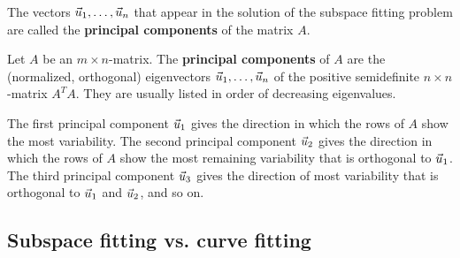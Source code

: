 \documentclass{ximera}
\begin{document}
The vectors $\vec{u}_1,\ldots,\vec{u}_n$ that appear in the solution
of the subspace fitting problem are called the \textbf{principal
  components} of the matrix $A$.

\begin{definition}\label{def:principal-components}
  Let $A$ be an $m\times n$-matrix. The \textbf{principal components}%
   of $A$ are the (normalized,
  orthogonal) eigenvectors $\vec{u}_1,\ldots,\vec{u}_n$ of the
  positive semidefinite $n\times n$-matrix $A^TA$. They are usually
  listed in order of decreasing eigenvalues.
\end{definition}

The first principal component $\vec{u}_1$ gives the direction in
which the rows of $A$ show the most variability. The second principal
component $\vec{u}_2$ gives the direction in which the rows of $A$
show the most remaining variability that is orthogonal to
$\vec{u}_1$. The third principal component $\vec{u}_3$ gives the
direction of most variability that is orthogonal to $\vec{u}_1$ and
$\vec{u}_2$, and so on.

\subsection*{Subspace fitting vs. curve fitting}
\end{document}
